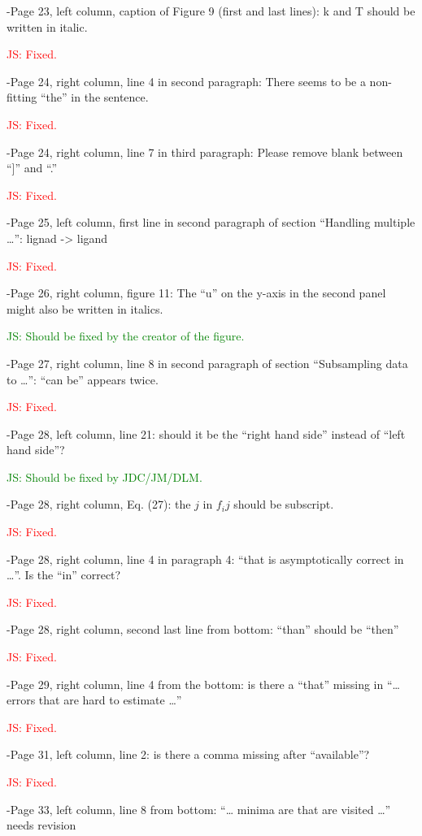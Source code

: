 \documentclass[10pt,stdletter]{newlfm}
\begin{document}
\begin{newlfm}
-Page 23, left column, caption of Figure 9 (first and last lines): k and T should be written in italic.

\textcolor{red}{JS: Fixed.}

-Page 24, right column, line 4 in second paragraph: There seems to be a non-fitting “the” in the sentence.

\textcolor{red}{JS: Fixed.}

-Page 24, right column, line 7 in third paragraph: Please remove blank between “]” and “.”

\textcolor{red}{JS: Fixed.}

-Page 25, left column, first line in second paragraph of section “Handling multiple …”: lignad -> ligand

\textcolor{red}{JS: Fixed.}

-Page 26, right column, figure 11: The “u” on the y-axis in the second panel might also be written in italics.

\textcolor{green}{JS: Should be fixed by the creator of the figure.}

-Page 27, right column, line 8 in second paragraph of section “Subsampling data to …”: “can be” appears twice.

\textcolor{red}{JS: Fixed.}

-Page 28, left column, line 21: should it be the “right hand side” instead of “left hand side”?

\textcolor{green}{JS: Should be fixed by JDC/JM/DLM.}

-Page 28, right column, Eq. (27): the $j$ in $f_ij$ should be subscript.

\textcolor{red}{JS: Fixed.}

-Page 28, right column, line 4 in paragraph 4: “that is asymptotically correct in …”. Is the “in” correct?

\textcolor{red}{JS: Fixed.}

-Page 28, right column, second last line from bottom: “than” should be “then”

\textcolor{red}{JS: Fixed.}

-Page 29, right column, line 4 from the bottom: is there a “that” missing in “… errors that are hard to estimate …”

\textcolor{red}{JS: Fixed.}

-Page 31, left column, line 2: is there a comma missing after “available”?

\textcolor{red}{JS: Fixed.}

-Page 33, left column, line 8 from bottom: “… minima are that are visited …” needs revision


\end{newlfm}
\end{document}
